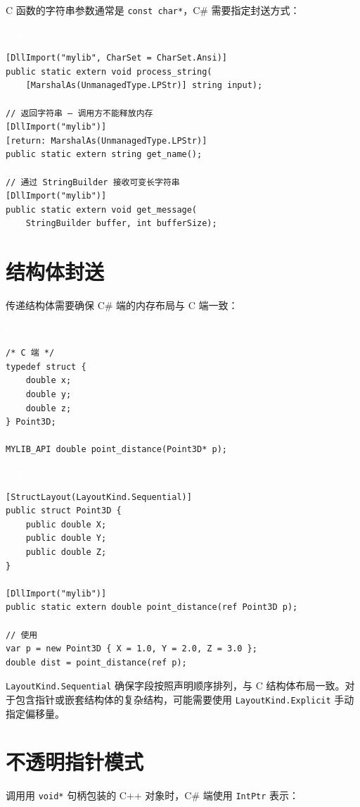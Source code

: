 \documentclass[12pt,a4paper,fontset=fandol]{ctexbook}
\newcommand{\clabel}{%
  \begin{tcolorbox}[enhanced,colback=cheadbg,colframe=cheadbg,
    arc=1mm,boxrule=0mm,left=6pt,right=6pt,top=2pt,bottom=2pt,
    halign=left,oversize]
    \textcolor{white}{\small\bfseries C}
  \end{tcolorbox}\vspace{-4pt}}
\newcommand{\csharplabel}{%
  \begin{tcolorbox}[enhanced,colback=csharpheadbg,colframe=csharpheadbg,
    arc=1mm,boxrule=0mm,left=6pt,right=6pt,top=2pt,bottom=2pt,
    halign=left,oversize]
    \textcolor{white}{\small\bfseries C\#}
  \end{tcolorbox}\vspace{-4pt}}
\newcommand{\cpp}[1]{C++#1}
\newcommand{\Tp}[1]{\texttt{#1}}
\begin{document}
C 函数的字符串参数通常是 \texttt{const char*}，C\# 需要指定封送方式：

\csharplabel
\begin{lstlisting}[style=csharpstyle]
[DllImport("mylib", CharSet = CharSet.Ansi)]
public static extern void process_string(
    [MarshalAs(UnmanagedType.LPStr)] string input);

// 返回字符串 — 调用方不能释放内存
[DllImport("mylib")]
[return: MarshalAs(UnmanagedType.LPStr)]
public static extern string get_name();

// 通过 StringBuilder 接收可变长字符串
[DllImport("mylib")]
public static extern void get_message(
    StringBuilder buffer, int bufferSize);
\end{lstlisting}

\section{结构体封送}

传递结构体需要确保 C\# 端的内存布局与 C 端一致：

\clabel
\begin{lstlisting}[style=cstyle]
/* C 端 */
typedef struct {
    double x;
    double y;
    double z;
} Point3D;

MYLIB_API double point_distance(Point3D* p);
\end{lstlisting}

\csharplabel
\begin{lstlisting}[style=csharpstyle]
[StructLayout(LayoutKind.Sequential)]
public struct Point3D {
    public double X;
    public double Y;
    public double Z;
}

[DllImport("mylib")]
public static extern double point_distance(ref Point3D p);

// 使用
var p = new Point3D { X = 1.0, Y = 2.0, Z = 3.0 };
double dist = point_distance(ref p);
\end{lstlisting}

\Tp{LayoutKind.Sequential} 确保字段按照声明顺序排列，与 C 结构体布局一致。对于包含指针或嵌套结构体的复杂结构，可能需要使用 \Tp{LayoutKind.Explicit} 手动指定偏移量。

\section{不透明指针模式}

调用用 \texttt{void*} 句柄包装的 \cpp{} 对象时，C\# 端使用 \Tp{IntPtr} 表示：
\end{document}
